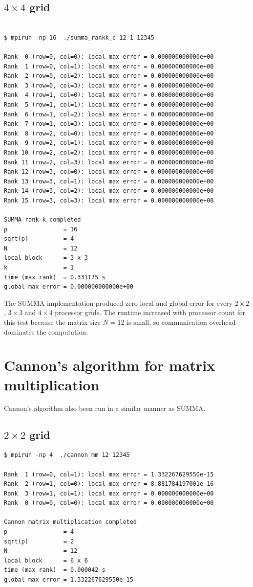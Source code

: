 \documentclass{article}[12pt]
\begin{document}
\subsection{$4\times 4$ grid}
\begin{verbatim}

$ mpirun -np 16  ./summa_rankk_c 12 1 12345

Rank  0 (row=0, col=0): local max error = 0.000000000000e+00
Rank  1 (row=0, col=1): local max error = 0.000000000000e+00
Rank  2 (row=0, col=2): local max error = 0.000000000000e+00
Rank  3 (row=0, col=3): local max error = 0.000000000000e+00
Rank  4 (row=1, col=0): local max error = 0.000000000000e+00
Rank  5 (row=1, col=1): local max error = 0.000000000000e+00
Rank  6 (row=1, col=2): local max error = 0.000000000000e+00
Rank  7 (row=1, col=3): local max error = 0.000000000000e+00
Rank  8 (row=2, col=0): local max error = 0.000000000000e+00
Rank  9 (row=2, col=1): local max error = 0.000000000000e+00
Rank 10 (row=2, col=2): local max error = 0.000000000000e+00
Rank 11 (row=2, col=3): local max error = 0.000000000000e+00
Rank 12 (row=3, col=0): local max error = 0.000000000000e+00
Rank 13 (row=3, col=1): local max error = 0.000000000000e+00
Rank 14 (row=3, col=2): local max error = 0.000000000000e+00
Rank 15 (row=3, col=3): local max error = 0.000000000000e+00

SUMMA rank-k completed
p                = 16
sqrt(p)          = 4
N                = 12
local block      = 3 x 3
k                = 1
time (max rank)  = 0.331175 s
global max error = 0.000000000000e+00
\end{verbatim}

The SUMMA implementation produced zero local and global error for every $2\times2$, $3\times3$ and $4\times4$ processor grids. The runtime increased with processor count for this test because the matrix size $N=12$ is small, so communication overhead dominates the computation.
\section{Cannon's algorithm for matrix multiplication}

Cannon's algorithm also been run in a similar manner as SUMMA.

\subsection{$2 \times 2$ grid}

\begin{verbatim}
$ mpirun -np 4  ./cannon_mm 12 12345

Rank  1 (row=0, col=1): local max error = 1.332267629550e-15
Rank  2 (row=1, col=0): local max error = 8.881784197001e-16
Rank  3 (row=1, col=1): local max error = 0.000000000000e+00
Rank  0 (row=0, col=0): local max error = 0.000000000000e+00

Cannon matrix multiplication completed
p                = 4
sqrt(p)          = 2
N                = 12
local block      = 6 x 6
time (max rank)  = 0.000042 s
global max error = 1.332267629550e-15
 
\end{verbatim}
\end{document}
